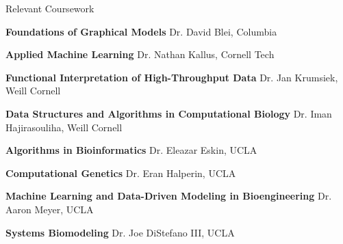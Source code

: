 \documentclass{resume} %
\begin{document}
\begin{rSection}{Relevant Coursework}

\item \textbf{Foundations of Graphical Models} \newline
Dr. David Blei, Columbia

\item \textbf{Applied Machine Learning} \newline
Dr. Nathan Kallus, Cornell Tech

\item \textbf{Functional Interpretation of High-Throughput Data} \newline
Dr. Jan Krumsiek, Weill Cornell

\item \textbf{Data Structures and Algorithms in Computational Biology} \newline
Dr. Iman Hajirasouliha, Weill Cornell

\item \textbf{Algorithms in Bioinformatics} \newline
Dr. Eleazar Eskin, UCLA

\item \textbf{Computational Genetics} \newline
Dr. Eran Halperin, UCLA

\item \textbf{Machine Learning and Data-Driven Modeling in Bioengineering} \newline
Dr. Aaron Meyer, UCLA

\item \textbf{Systems Biomodeling} \newline
Dr. Joe DiStefano III, UCLA


\end{rSection}
\end{document}
